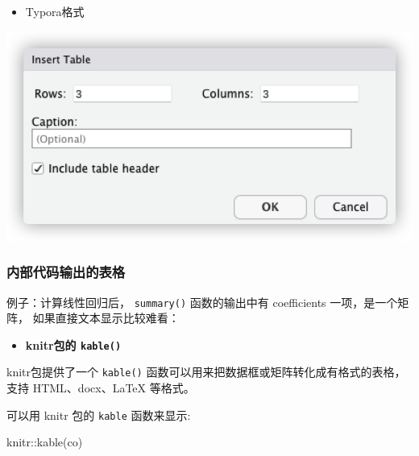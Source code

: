 \documentclass[
]{book}
\newenvironment{Shaded}{\begin{snugshade}}{\end{snugshade}}
\newcommand{\NormalTok}[1]{#1}
\providecommand{\tightlist}{%
  \setlength{\itemsep}{0pt}\setlength{\parskip}{0pt}}
\begin{document}
\begin{itemize}
\tightlist
\item
  Typora格式
\end{itemize}

\includegraphics{images/paste-DA97584B.png}

\hypertarget{ux5185ux90e8ux4ee3ux7801ux8f93ux51faux7684ux8868ux683c}{%
\subsubsection{内部代码输出的表格}\label{ux5185ux90e8ux4ee3ux7801ux8f93ux51faux7684ux8868ux683c}}

例子：计算线性回归后， \texttt{summary()} 函数的输出中有 coefficients
一项，是一个矩阵， 如果直接文本显示比较难看：

\begin{Shaded}
\end{Shaded}

\begin{itemize}
\tightlist
\item
  \textbf{knitr包的 \texttt{kable()}}
\end{itemize}

knitr包提供了一个 \texttt{kable()}
函数可以用来把数据框或矩阵转化成有格式的表格， 支持 HTML、docx、LaTeX
等格式。

可以用 knitr 包的 \texttt{kable} 函数来显示:

\begin{Shaded}
\begin{Highlighting}[]
\NormalTok{knitr::kable(co)}
\end{Highlighting}
\end{Shaded}
\end{document}
